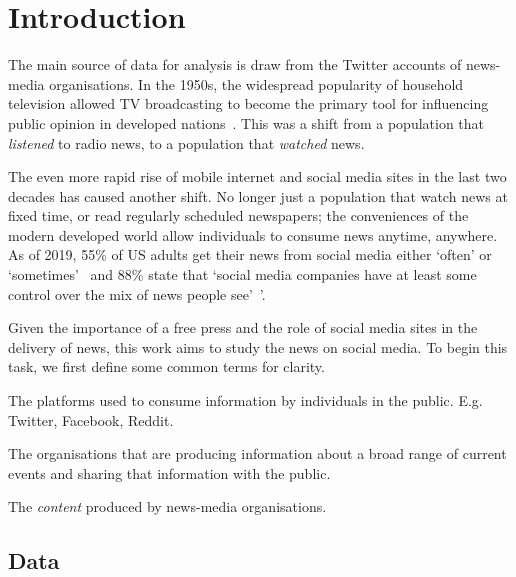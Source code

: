 \chapter{Introduction \label{ch:intro}}



The main source of data for analysis is draw from the Twitter accounts of news-media organisations. In the 1950s, the widespread popularity of household television allowed TV broadcasting to become the primary tool for influencing public opinion in developed nations~.  This was a shift from a population that \emph{listened} to radio news, to a population that \emph{watched} news. 

The even more rapid rise of mobile internet and social media sites in the last two decades has caused another shift. No longer just a population that watch news at fixed time, or read regularly scheduled newspapers; the conveniences of the modern developed world allow individuals to consume news anytime, anywhere. As of 2019, 55\% of US adults get their news from social media either `often' or `sometimes'~ and 88\% state that `social media companies have at least some control over the mix of news people see'~'\cite{shearerAmericansAreWary2019}.

Given the importance of a free press and the role of social media sites in the delivery of news, this work aims to study the news on social media. To begin this task, we first define some common terms for clarity.

\begin{definition}
	The platforms used to consume information by individuals in the public. E.g. Twitter, Facebook, Reddit.
\end{definition}

\begin{definition}
	The organisations that are producing information about a broad range of current events and sharing that information with the public.
\end{definition}

\begin{definition}[News]
	The \emph{content} produced by news-media organisations. 
\end{definition}

\section{Data}

